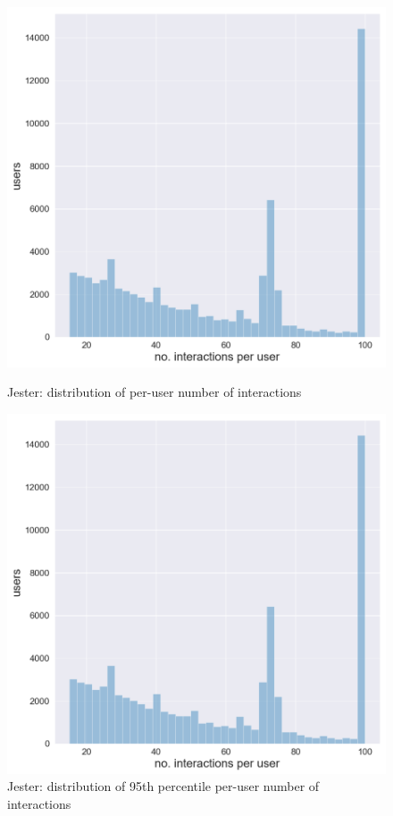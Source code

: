 \begin{figure}[htbp]
    \begin{minipage}{0.48\textwidth}
    \centering
      \includegraphics[width=\textwidth]{datasets/Jester_user_interaction_distr.png}
      \caption{Jester: distribution of per-user number of interactions}
      \label{fig:jester_dist}
    \end{minipage}
    \hfill
    \begin{minipage}{0.48\textwidth}
    \centering
     \includegraphics[width=\textwidth]{datasets/Jester_95th_interaction_distr.png} 
     \caption{Jester: distribution of 95th percentile per-user number of interactions}
      \label{fig:jester_dist_95}
    \end{minipage}
\end{figure}

